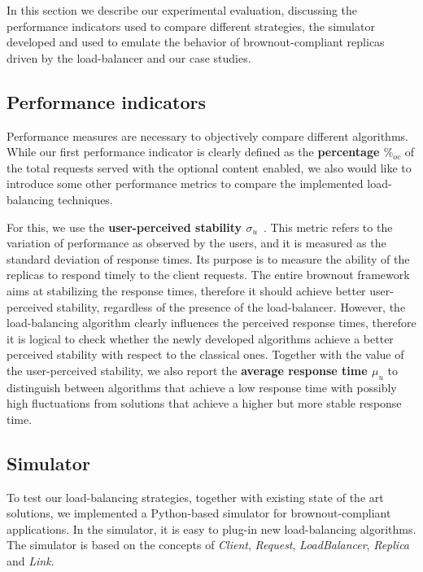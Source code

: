 In this section we describe our experimental evaluation, discussing
the performance indicators used to compare different strategies, the
simulator developed and used to emulate the behavior of
brownout-compliant replicas driven by the load-balancer and our case
studies.

\subsection{Performance indicators}

Performance measures are necessary to objectively compare different
algorithms. While our first performance indicator is clearly defined
as the \textbf{percentage $\%_{oc}$} of the total requests served with
the optional content enabled, we also would like to introduce some
other performance metrics to compare the implemented load-balancing
techniques.

For this, we use the \textbf{user-perceived stability
  $\sigma_u$}~\cite{GeograficalSASO}. This metric refers to the
variation of performance as observed by the users, and it is measured
as the standard deviation of response times. Its purpose is to measure
the ability of the replicas to respond timely to the client
requests. The entire brownout framework aims at stabilizing the
response times, therefore it should achieve better user-perceived
stability, regardless of the presence of the load-balancer. However,
the load-balancing algorithm clearly influences the perceived response
times, therefore it is logical to check whether the newly developed
algorithms achieve a better perceived stability with respect to the
classical ones. Together with the value of the user-perceived
stability, we also report the \textbf{average response time $\mu_u$}
to distinguish between algorithms that achieve a low response time
with possibly high fluctuations from solutions that achieve a higher
but more stable response time.

\subsection{Simulator}

To test our load-balancing strategies, together with existing state of
the art solutions, we implemented a Python-based simulator for
brownout-compliant applications. In the simulator, it is easy to
plug-in new load-balancing algorithms. The simulator is based on the
concepts of \emph{Client}, \emph{Request}, \emph{LoadBalancer},
\emph{Replica} and \emph{Link}.

